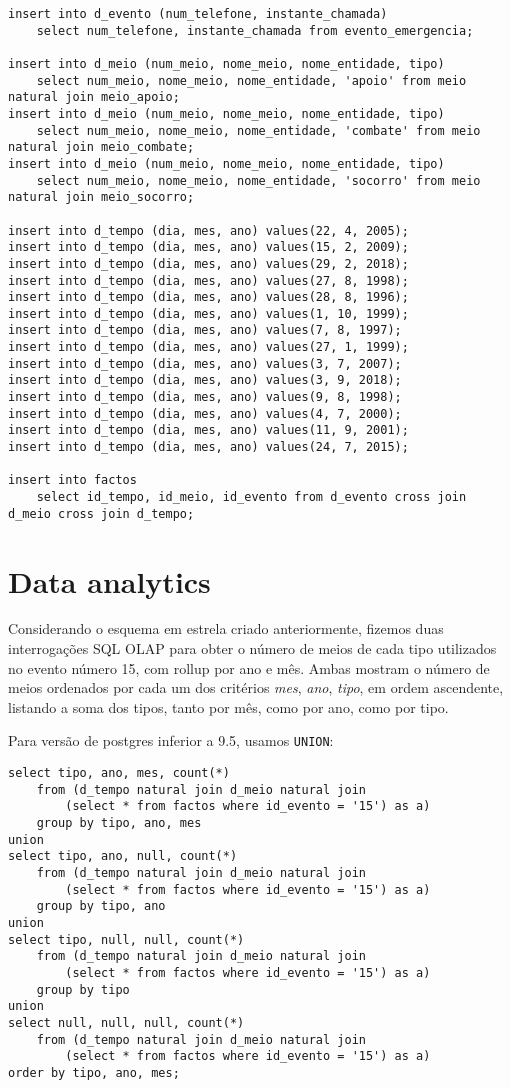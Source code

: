 \documentclass[10pt,a4paper]{article}
\begin{document}
\begin{verbatim}
insert into d_evento (num_telefone, instante_chamada)
    select num_telefone, instante_chamada from evento_emergencia;

insert into d_meio (num_meio, nome_meio, nome_entidade, tipo)
    select num_meio, nome_meio, nome_entidade, 'apoio' from meio natural join meio_apoio;
insert into d_meio (num_meio, nome_meio, nome_entidade, tipo)
    select num_meio, nome_meio, nome_entidade, 'combate' from meio natural join meio_combate;
insert into d_meio (num_meio, nome_meio, nome_entidade, tipo)
    select num_meio, nome_meio, nome_entidade, 'socorro' from meio natural join meio_socorro;

insert into d_tempo (dia, mes, ano) values(22, 4, 2005);
insert into d_tempo (dia, mes, ano) values(15, 2, 2009);
insert into d_tempo (dia, mes, ano) values(29, 2, 2018);
insert into d_tempo (dia, mes, ano) values(27, 8, 1998);
insert into d_tempo (dia, mes, ano) values(28, 8, 1996);
insert into d_tempo (dia, mes, ano) values(1, 10, 1999);
insert into d_tempo (dia, mes, ano) values(7, 8, 1997);
insert into d_tempo (dia, mes, ano) values(27, 1, 1999);
insert into d_tempo (dia, mes, ano) values(3, 7, 2007);
insert into d_tempo (dia, mes, ano) values(3, 9, 2018);
insert into d_tempo (dia, mes, ano) values(9, 8, 1998);
insert into d_tempo (dia, mes, ano) values(4, 7, 2000);
insert into d_tempo (dia, mes, ano) values(11, 9, 2001);
insert into d_tempo (dia, mes, ano) values(24, 7, 2015);

insert into factos
    select id_tempo, id_meio, id_evento from d_evento cross join d_meio cross join d_tempo;
\end{verbatim}

\section{Data analytics}

Considerando o esquema em estrela criado anteriormente, fizemos duas interrogações
SQL OLAP para obter o número de meios de cada tipo utilizados no evento número 15, com
rollup por ano e mês. Ambas mostram o número de meios ordenados por cada um dos critérios
\textit{mes}, \textit{ano}, \textit{tipo}, em ordem ascendente, listando a soma dos tipos,
tanto por mês, como por ano, como por tipo.

Para versão de postgres inferior a 9.5, usamos \texttt{UNION}:

\begin{verbatim}
select tipo, ano, mes, count(*)
    from (d_tempo natural join d_meio natural join
        (select * from factos where id_evento = '15') as a) 
    group by tipo, ano, mes
union
select tipo, ano, null, count(*) 
    from (d_tempo natural join d_meio natural join
        (select * from factos where id_evento = '15') as a) 
    group by tipo, ano
union
select tipo, null, null, count(*) 
    from (d_tempo natural join d_meio natural join
        (select * from factos where id_evento = '15') as a) 
    group by tipo
union
select null, null, null, count(*) 
    from (d_tempo natural join d_meio natural join
        (select * from factos where id_evento = '15') as a)
order by tipo, ano, mes;
\end{verbatim}
\end{document}
